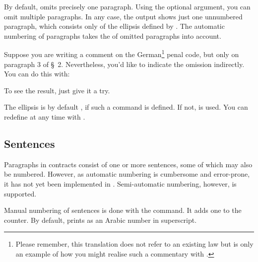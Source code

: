 By default,  omits precisely one paragraph. Using the
optional argument, you can omit multiple paragraphs. In any case, the output
shows just one unnumbered paragraph, which consists only of the ellipsis
defined by . The automatic numbering of paragraphs takes
the  of omitted paragraphs into account.
\begin{Example}
  Suppose you are writing a comment on the German\footnote{Please remember,
    this translation does not refer to an existing law but is only an example
    of how you might realise such a commentary with .} penal
  code, but only on paragraph 3 of \S~2. Nevertheless, you'd like to indicate
  the omission indirectly. You can do this with:
  To see the result, just give it a try.
\end{Example}

The ellipsis is by default , if
such a command is defined. If not,  is used. You can redefine
 at any time with .%
\EndIndexGroup
%
\EndIndexGroup


\subsection{Sentences}
\label{sec:scrjura.sentence}

\BeginIndexGroup%
%
Paragraphs in contracts consist of one or more sentences, some of which may
also be numbered. However, as automatic numbering is cumbersome and
error-prone, it has not yet been implemented in
. Semi-automatic numbering, however, is supported.

\begin{Declaration}
\end{Declaration}
Manual numbering of sentences is done with the  command. It
adds one to the  counter. By default,
 prints
 as an Arabic number in superscript.

